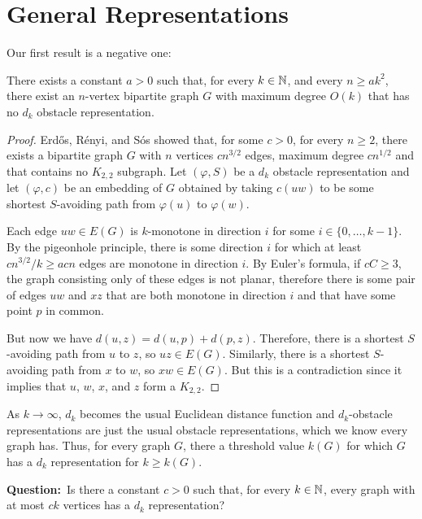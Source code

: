 \documentclass{patmorin}
\newcommand{\question}[1]{\textbf{\color{red}Question:}~#1}
\begin{document}
\section{General Representations}

Our first result is a negative one:

\begin{thm}
  There exists a constant $a>0$ such that, for every $k\in \mathbb{N}$, and every
  $n\ge ak^2$, there exist an $n$-vertex bipartite graph $G$ with maximum
  degree $O(k)$ that has no $d_k$ obstacle representation.
\end{thm}

\begin{proof}
   Erd\H{o}s, R\'enyi, and S\'os \cite{erdos.renyi.ea:1966} showed that,
   for some $c>0$, for every $n\ge 2$, there exists a bipartite graph
   $G$ with $n$ vertices $cn^{3/2}$ edges, maximum degree $cn^{1/2}$
   and that contains no $K_{2,2}$ subgraph.  Let $(\varphi,S)$ be a
   $d_k$ obstacle representation and let $(\varphi,c)$
   be an embedding of $G$ obtained by taking $c(uw)$ to be some shortest
   $S$-avoiding path from $\varphi(u)$ to $\varphi(w)$.

   Each edge $uw\in E(G)$ is $k$-monotone in direction $i$ for some
   $i\in\{0,\ldots,k-1\}$.  By the pigeonhole principle, there is
   some direction $i$ for which at least $cn^{3/2}/k\ge acn$ edges
   are monotone in direction $i$.  By Euler's formula, if $cC\ge 3$,
   the graph consisting only of these edges is not planar, therefore
   there is some pair of edges $uw$ and $xz$ that are both monotone in
   direction $i$ and that have some point $p$ in common.

   But now we have $d(u,z)=d(u,p)+d(p,z)$.  Therefore, there is a shortest
   $S$-avoiding path from $u$ to $z$, so $uz\in E(G)$.  Similarly, there
   is a shortest $S$-avoiding path from $x$ to $w$, so $xw\in E(G)$.
   But this is a contradiction since it implies that $u$, $w$, $x$,
   and $z$ form a $K_{2,2}$.
\end{proof}

As $k\to\infty$, $d_k$ becomes the usual Euclidean distance
function and $d_k$-obstacle representations are just the usual obstacle
representations, which we know every graph has.  Thus, for every
graph $G$, there a threshold value $k(G)$ for which $G$ has a $d_k$
representation for $k\ge k(G)$.

\question{Is there a constant $c>0$ such that, for every $k\in\mathbb{N}$,
every graph with at most $ck$ vertices has a $d_k$ representation?}
\end{document}
